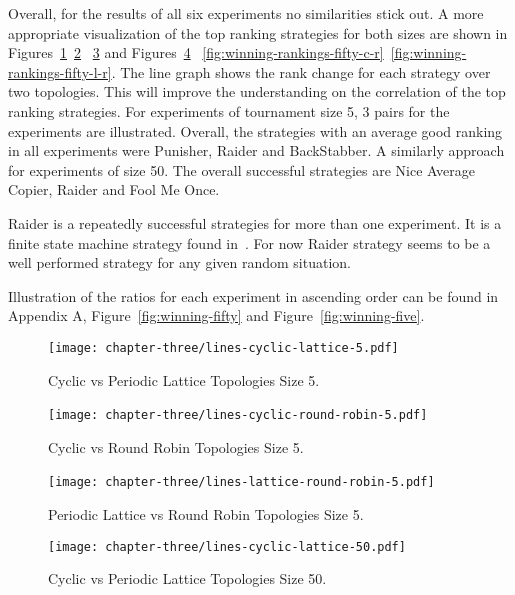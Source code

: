 Overall, for the results of all six experiments no similarities stick out.
A more appropriate visualization of the top ranking strategies for both
sizes are shown in Figures~\ref{fig:winning-rankings-five-c-l}~\ref{fig:winning-rankings-five-c-r}
~\ref{fig:winning-rankings-five-l-r} and Figures~\ref{fig:winning-rankings-fifty-c-l}
~\ref{fig:winning-rankings-fifty-c-r}~\ref{fig:winning-rankings-fifty-l-r}.
The line graph shows the rank change for each strategy over two topologies.
This will improve the understanding on the correlation of the top ranking strategies.
For experiments of tournament size 5, 3
pairs for the experiments are illustrated. Overall, the strategies with an
average good ranking in all experiments were Punisher, Raider and BackStabber.
A similarly approach for experiments of size 50.
The overall successful strategies are Nice Average Copier, Raider and Fool Me Once.

Raider is a repeatedly successful strategies for more than one experiment.
It is a finite state machine strategy found in~\cite{DBLP:conf/foci/AshlockTA14}.
For now Raider strategy seems to be a well performed strategy for any
given random situation.

Illustration of the ratios for each experiment in ascending order can be found
in Appendix A, Figure~\ref{fig:winning-fifty} and Figure~\ref{fig:winning-five}.

\begin{figure}[H]
	\centering
	\texttt{[image: chapter-three/lines-cyclic-lattice-5.pdf]}
	\caption{Cyclic vs Periodic Lattice Topologies Size 5.}
	\label{fig:winning-rankings-five-c-l}
\end{figure}

\begin{figure}[H]
	\centering
	\texttt{[image: chapter-three/lines-cyclic-round-robin-5.pdf]}\
	\caption{Cyclic vs Round Robin Topologies Size 5.}
	\label{fig:winning-rankings-five-c-r}
\end{figure}

\begin{figure}[H]
	\centering
	\texttt{[image: chapter-three/lines-lattice-round-robin-5.pdf]}\
	\caption{Periodic Lattice vs Round
	Robin Topologies Size 5.}
	\label{fig:winning-rankings-five-l-r}
\end{figure}

\begin{figure}[H]
	\centering
	\texttt{[image: chapter-three/lines-cyclic-lattice-50.pdf]}
	\caption{Cyclic vs Periodic Lattice Topologies Size 50.}
	\label{fig:winning-rankings-fifty-c-l}
\end{figure}

